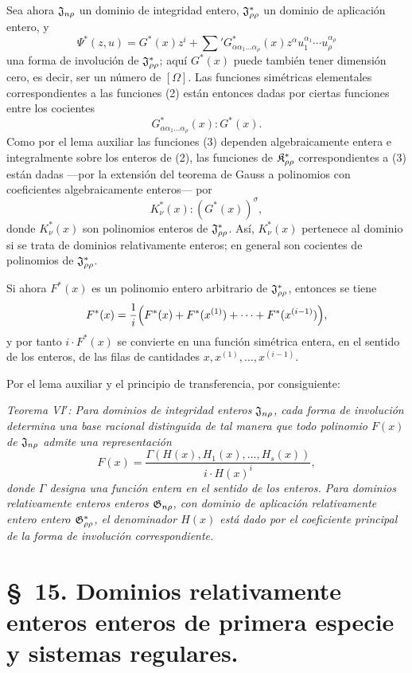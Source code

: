 \documentclass[11pt]{article}
\begin{document}
Sea ahora $\mathfrak{J}_{n\rho}$ un dominio de integridad entero, $\mathfrak{J}^*_{\rho\rho}$ un dominio de aplicación entero, y
\[
  \Psi^*(z,u)=G^*(x)z^i+
  \sum{}'G^*_{\alpha\alpha_1\ldots\alpha_\rho}(x)
  z^\alpha u_1^{\alpha_1}\cdots u_\rho^{\alpha_\rho}
\]
una forma de involución de $\mathfrak{J}^*_{\rho\rho}$; aquí $G^*(x)$ puede también tener dimensión cero, es decir, ser un número de $[\Omega]$. Las funciones simétricas elementales correspondientes a las funciones (2) están entonces dadas por ciertas funciones entre los cocientes
\begin{equation}
  G^*_{\alpha\alpha_1\ldots\alpha_\rho}(x):G^*(x).
\tag{4}
\end{equation}
Como por el lema auxiliar las funciones (3) dependen algebraicamente entera e integralmente sobre los enteros de (2), las funciones de $\mathfrak{K}^*_{\rho\rho}$ correspondientes a (3) están dadas ---por la extensión del teorema de Gauss a polinomios con coeficientes algebraicamente enteros--- por
\begin{equation}
  K_\nu^*(x):(G^*(x))^\sigma,
\tag{5}
\end{equation}
donde $K_\nu^*(x)$ son polinomios enteros de $\mathfrak{J}^*_{\rho\rho}$. Así, $K_\nu^*(x)$ pertenece al dominio si se trata de dominios relativamente enteros; en general son cocientes de polinomios de $\mathfrak{J}^*_{\rho\rho}$.

Si ahora $F^*(x)$ es un polinomio entero arbitrario de $\mathfrak{J}^*_{\rho\rho}$, entonces se tiene
\[
  F^*(x)=\frac1i\Bigl(F^*(x)+F^*(x^{(1)})+\cdots+F^*(x^{(i-1)})\Bigr),
\]
y por tanto $i\cdot F^*(x)$ se convierte en una función simétrica entera, en el sentido de los enteros, de las filas de cantidades $x,x^{(1)},\ldots,x^{(i-1)}$.

Por el lema auxiliar y el principio de transferencia, por consiguiente:

\emph{Teorema VI$'$: Para dominios de integridad enteros $\mathfrak{J}_{n\rho}$, cada forma de involución determina una base racional distinguida de tal manera que todo polinomio $F(x)$ de $\mathfrak{J}_{n\rho}$ admite una representación}
\[
  F(x)=\frac{\Gamma(H(x),H_1(x),\ldots,H_s(x))}{i\cdot H(x)^i},
\]
\emph{donde $\Gamma$ designa una función entera en el sentido de los enteros. Para dominios relativamente enteros enteros $\mathfrak{G}_{n\rho}$, con dominio de aplicación relativamente entero entero $\mathfrak{G}^*_{\rho\rho}$, el denominador $H(x)$ está dado por el coeficiente principal de la forma de involución correspondiente.}

\section*{\S\ 15. Dominios relativamente enteros enteros de primera especie y sistemas regulares.}
\end{document}
